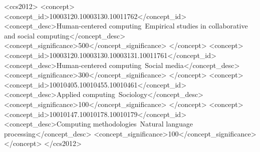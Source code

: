 \documentclass[acmsmall]{acmart}
\begin{document}
\begin{CCSXML}
<ccs2012>
 <concept>
  <concept_id>10003120.10003130.10011762</concept_id>
  <concept_desc>Human-centered computing~Empirical studies in collaborative and social computing</concept_desc>
  <concept_significance>500</concept_significance>
 </concept>
 <concept>
  <concept_id>10003120.10003130.10003131.10011761</concept_id>
  <concept_desc>Human-centered computing~Social media</concept_desc>
  <concept_significance>300</concept_significance>
 </concept>
 <concept>
  <concept_id>10010405.10010455.10010461</concept_id>
  <concept_desc>Applied computing~Sociology</concept_desc>
  <concept_significance>100</concept_significance>
 </concept>
 <concept>
  <concept_id>10010147.10010178.10010179</concept_id>
  <concept_desc>Computing methodologies~Natural language processing</concept_desc>
  <concept_significance>100</concept_significance>
 </concept>
</ccs2012>
\end{CCSXML}



\maketitle























\end{document}
